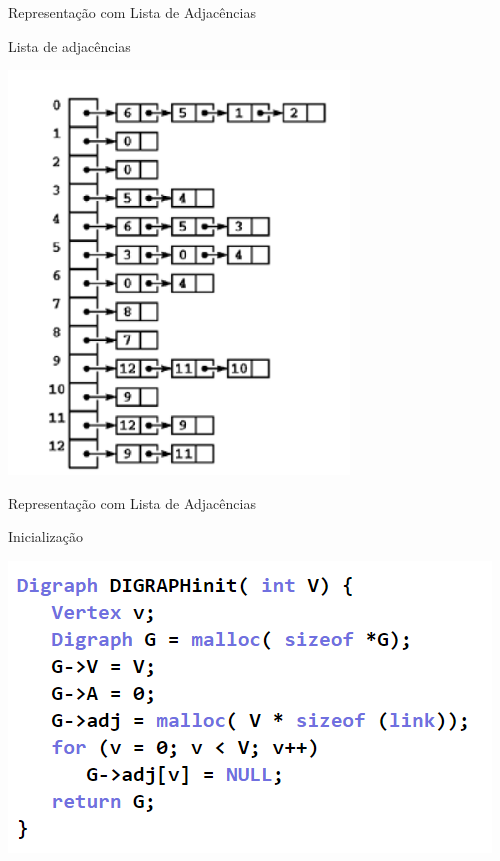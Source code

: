\documentclass[xcolor=dvipsnames,table]{beamer}
\begin{document}
	\begin{frame}{Representação com Lista de Adjacências}
		\begin{block}{Lista de adjacências}
			\begin{center}
	    		\includegraphics[height=.5\textheight]{images/lista/imagem.png}
	  		\end{center}
		\end{block}
	\end{frame}
	
	\begin{frame}{Representação com Lista de Adjacências}
		\begin{block}{Inicialização}
			\begin{center}
	    		\includegraphics[height=.6\textheight]{images/lista/digraph-init.png}
	  		\end{center}
		\end{block}
	\end{frame}	
	
\end{document}
